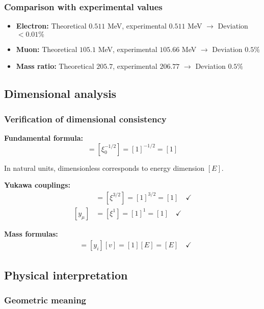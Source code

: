 \documentclass[12pt,a4paper]{article}
\begin{document}
\subsubsection{Comparison with experimental values}

\begin{itemize}
	\item \textbf{Electron:} Theoretical $0.511$ MeV, experimental $0.511$ MeV $\rightarrow$ Deviation $< 0.01\%$
	\item \textbf{Muon:} Theoretical $105.1$ MeV, experimental $105.66$ MeV $\rightarrow$ Deviation $0.5\%$
	\item \textbf{Mass ratio:} Theoretical $205.7$, experimental $206.77$ $\rightarrow$ Deviation $0.5\%$
\end{itemize}

\subsection{Dimensional analysis}

\subsubsection{Verification of dimensional consistency}

\textbf{Fundamental formula:}
\begin{equation}
	[v] = [\xi_0^{-1/2}] = [1]^{-1/2} = [1]
\end{equation}

In natural units, dimensionless corresponds to energy dimension $[E]$.

\textbf{Yukawa couplings:}
\begin{align}
	[y_e] &= [\xi^{3/2}] = [1]^{3/2} = [1] \quad \checkmark\\
	[y_\mu] &= [\xi^1] = [1]^1 = [1] \quad \checkmark
\end{align}

\textbf{Mass formulas:}
\begin{align}
	[m_i] &= [y_i][v] = [1][E] = [E] \quad \checkmark
\end{align}

\subsection{Physical interpretation}

\subsubsection{Geometric meaning}
\end{document}
